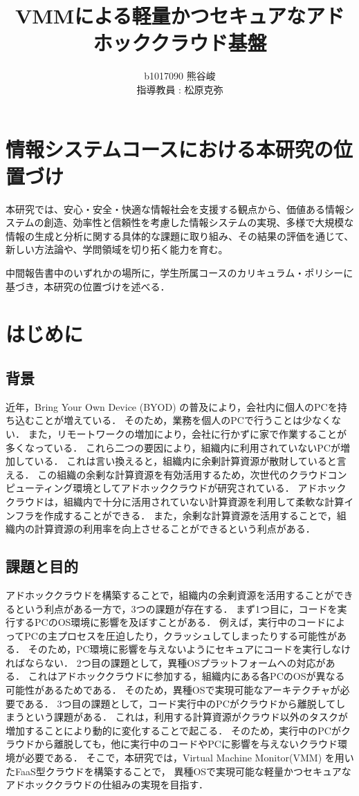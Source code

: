 \documentclass[11pt]{ujarticle} %
\author{%
b1017090 熊谷峻\\指導教員 : 松原克弥
}
\title{VMMによる軽量かつセキュアなアドホッククラウド基盤}
\begin{document}
\maketitle

\section{情報システムコースにおける本研究の位置づけ}
本研究では、安心・安全・快適な情報社会を支援する観点から、価値ある情報システムの創造、効率性と信頼性を考慮した情報システムの実現、多様で大規模な情報の生成と分析に関する具体的な課題に取り組み、その結果の評価を通じて、新しい方法論や、学問領域を切り拓く能力を育む。

中間報告書中のいずれかの場所に，学生所属コースのカリキュラム・ポリシーに基づき，本研究の位置づけを述べる．

\section{はじめに}
\subsection{背景}
近年，Bring Your Own Device (BYOD) の普及により，会社内に個人のPCを持ち込むことが増えている． そのため，業務を個人のPCで行うことは少なくない． また，リモートワークの増加により，会社に行かずに家で作業することが多くなっている． これら二つの要因により，組織内に利用されていないPCが増加している． これは言い換えると，組織内に余剰計算資源が散財していると言える． この組織の余剰な計算資源を有効活用するため，次世代のクラウドコンピューティング環境としてアドホッククラウドが研究されている． アドホッククラウドは，組織内で十分に活用されていない計算資源を利用して柔軟な計算インフラを作成することができる． また，余剰な計算資源を活用することで，組織内の計算資源の利用率を向上させることができるという利点がある．

\subsection{課題と目的}
アドホッククラウドを構築することで，組織内の余剰資源を活用することができるという利点がある一方で，3つの課題が存在する． まず1つ目に，コードを実行するPCのOS環境に影響を及ぼすことがある． 例えば，実行中のコードによってPCの主プロセスを圧迫したり，クラッシュしてしまったりする可能性がある． そのため，PC環境に影響を与えないようにセキュアにコードを実行しなければならない． 2つ目の課題として，異種OSプラットフォームへの対応がある． これはアドホッククラウドに参加する，組織内にある各PCのOSが異なる可能性があるためである． そのため，異種OSで実現可能なアーキテクチャが必要である． 3つ目の課題として，コード実行中のPCがクラウドから離脱してしまうという課題がある． これは，利用する計算資源がクラウド以外のタスクが増加することにより動的に変化することで起こる． そのため，実行中のPCがクラウドから離脱しても，他に実行中のコードやPCに影響を与えないクラウド環境が必要である． そこで，本研究では，Virtual Machine Monitor(VMM) を用いたFaaS型クラウドを構築することで， 異種OSで実現可能な軽量かつセキュアなアドホッククラウドの仕組みの実現を目指す．
\end{document}
